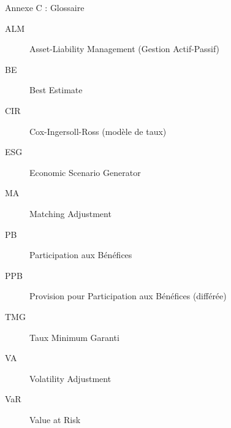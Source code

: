 \documentclass[10pt,aspectratio=169,xcolor={dvipsnames}]{beamer}
\begin{document}
\begin{frame}{Annexe C : Glossaire}
\begin{description}
    \item[ALM] Asset-Liability Management (Gestion Actif-Passif)
    \item[BE] Best Estimate
    \item[CIR] Cox-Ingersoll-Ross (modèle de taux)
    \item[ESG] Economic Scenario Generator
    \item[MA] Matching Adjustment
    \item[PB] Participation aux Bénéfices
    \item[PPB] Provision pour Participation aux Bénéfices (différée)
    \item[TMG] Taux Minimum Garanti
    \item[VA] Volatility Adjustment
    \item[VaR] Value at Risk
\end{description}
\end{frame}
\end{document}
